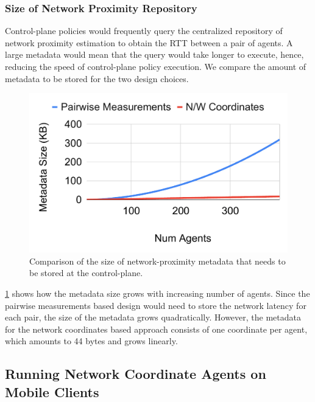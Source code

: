 \subsubsection{Size of Network Proximity Repository}
Control-plane policies would frequently query the centralized repository of network proximity estimation to obtain the RTT between a pair of agents. A large metadata would mean that the query would take longer to execute, hence, reducing the speed of control-plane policy execution. We compare the amount of metadata to be stored for the two design choices. 

\begin{figure}
\centering
\includegraphics[width=0.75\linewidth]{figures/design_space/nw_prox/metadata_size.pdf}
\caption{Comparison of the size of network-proximity metadata that needs to be stored at the control-plane.}
\label{fig:metadata_size}
\end{figure}

\par \cref{fig:metadata_size} shows how the metadata size grows with increasing number of agents. Since the pairwise measurements based design would need to store the network latency for each pair, the size of the metadata grows quadratically. However, the metadata for the network coordinates based approach consists of one coordinate per agent, which amounts to 44 bytes and grows linearly.

\subsection{Running Network Coordinate Agents on Mobile Clients}




